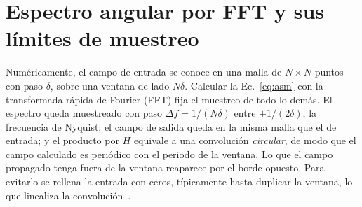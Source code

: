\section{Espectro angular por FFT y sus límites de muestreo}
\label{sec:asm-fft}

Numéricamente, el campo de entrada se conoce en una malla de $N\times N$
puntos con paso $\delta$, sobre una ventana de lado $N\delta$. Calcular la
Ec.~\eqref{eq:asm} con la transformada rápida de Fourier (FFT) fija el
muestreo de todo lo demás. El espectro queda muestreado con paso
$\Delta f = 1/(N\delta)$ entre $\pm 1/(2\delta)$, la frecuencia de Nyquist; el
campo de salida queda en la misma malla que el de entrada; y el producto por
$H$ equivale a una convolución \emph{circular}, de modo que el campo calculado
es periódico con el periodo de la ventana. Lo que el campo propagado tenga
fuera de la ventana reaparece por el borde opuesto. Para evitarlo se rellena
la entrada con ceros, típicamente hasta duplicar la ventana, lo que linealiza
la convolución~\cite{matsushima2009}.

